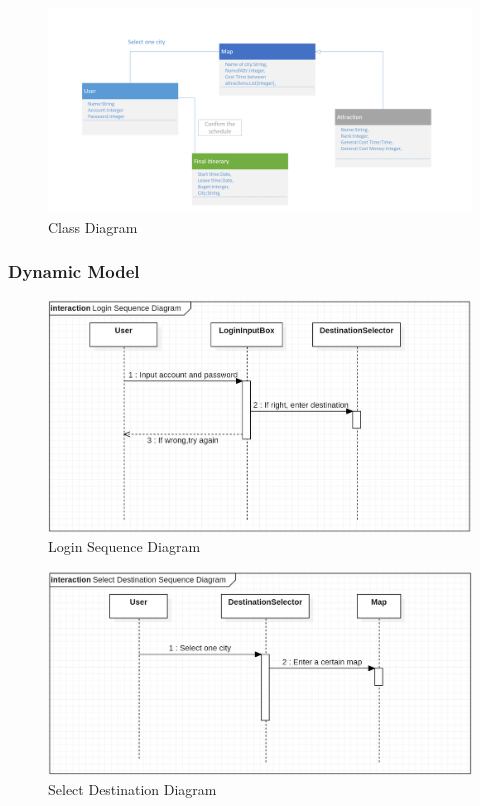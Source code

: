 \documentclass[10pt]{article}
\begin{document}
\begin{figure}[H]
	\centering
	\includegraphics[width=14cm]{2.png} 
	\caption{Class Diagram}
	\label{Class Diagram}
\end{figure}

\subsubsection{Dynamic Model}
\begin{figure}[H]
	\centering
	\includegraphics[width=14cm]{login.jpg} 
	\caption{Login Sequence Diagram}
	\label{Login Sequence Diagram}
\end{figure}

\begin{figure}[H]
	\centering
	\includegraphics[width=14cm]{destination.jpg} 
	\caption{Select Destination Diagram}
	\label{Select Destination Diagram}
\end{figure}
\end{document}
